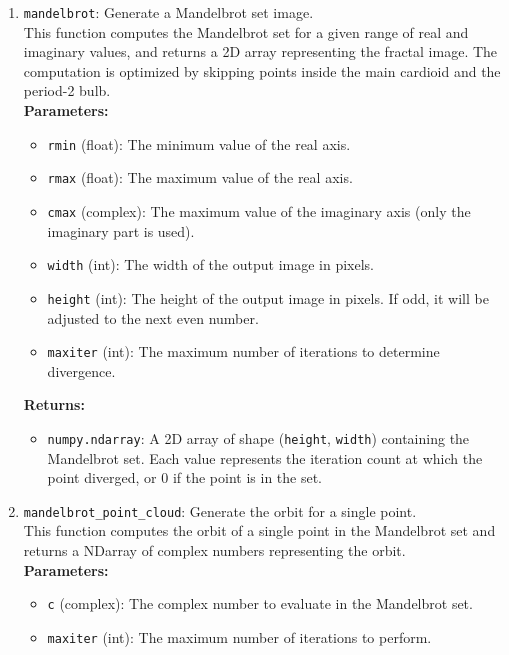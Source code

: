 \documentclass{article}
\begin{document}
\begin{enumerate}
    \item \texttt{mandelbrot}: Generate a Mandelbrot set image.\\
    This function computes the Mandelbrot set for a given range of real and imaginary values,
    and returns a 2D array representing the fractal image. The computation is optimized by
    skipping points inside the main cardioid and the period-2 bulb.\\
    \textbf{Parameters:}
    \begin{itemize}
        \item \texttt{rmin} (float): The minimum value of the real axis.
        \item \texttt{rmax} (float): The maximum value of the real axis.
        \item \texttt{cmax} (complex): The maximum value of the imaginary axis (only the imaginary part is used).
        \item \texttt{width} (int): The width of the output image in pixels.
        \item \texttt{height} (int): The height of the output image in pixels. If odd, it will be adjusted to the next even number.
        \item \texttt{maxiter} (int): The maximum number of iterations to determine divergence.
    \end{itemize}
    \textbf{Returns:}
    \begin{itemize}
        \item \texttt{numpy.ndarray}: A 2D array of shape (\texttt{height}, \texttt{width}) containing the Mandelbrot set.
        Each value represents the iteration count at which the point diverged,
        or 0 if the point is in the set.
    \end{itemize}
    \item \texttt{mandelbrot\_point\_cloud}: Generate the orbit for a single point. \\
    This function computes the orbit of a single point in the Mandelbrot set and returns
    a NDarray of complex numbers representing the orbit.\\
    \textbf{Parameters:}
    \begin{itemize}
        \item \texttt{c} (complex): The complex number to evaluate in the Mandelbrot set.
        \item \texttt{maxiter} (int): The maximum number of iterations to perform.
    \end{itemize}

\end{enumerate}
\end{document}
